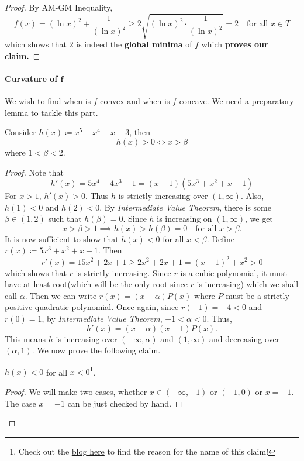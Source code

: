 \documentclass[numbers=endperiod, 11pt]{scrartcl}
\begin{document}
\begin{sol}
\begin{proof}
        By AM-GM Inequality,
        \[ f(x) = (\ln x)^2 + \frac{1}{(\ln x)^2} \ge 2\sqrt{(\ln x)^2 \cdot \frac{1}{(\ln x)^2}} = 2 \quad \text{for all } x \in T \]
        which shows that $2$ is indeed the
        \textbf{global minima} of $f$ which
        \textbf{proves our claim.}
    \end{proof}

    \paragraph{Curvature of $\bm{f}$} We wish to find
    when is $f$ convex and when is $f$ concave. We need a
    preparatory lemma to tackle this part.

    \begin{lemma*}
        Consider $h(x) \coloneqq x^5 - x^4 - x - 3$, then
        \[ h(x) > 0 \iff x > \beta\]
        where $1 < \beta < 2$.
    \end{lemma*}
    \begin{proof}
        Note that
        \[ h'(x) = 5x^4 - 4x^3 -1 = (x-1)(5x^3+x^2+x+1)\]
        For $x > 1$, $h'(x) > 0$. Thus $h$ is strictly
        increasing over $(1,\infty)$. Also,
        $h(1) < 0$ and $h(2) < 0$. By
        \emph{Intermediate Value Theorem}, there is
        some $\beta \in (1,2)$ such that $h(\beta) = 0$.
        Since $h$ is increasing on $(1,\infty)$, we get
        \[x > \beta > 1 \implies h(x) > h(\beta) = 0 \quad \text{for all }x > \beta. \]
        It is now sufficient to show that $h(x) < 0$
        for all $x < \beta$. Define
        $r(x) \coloneqq 5x^3 + x^2 + x + 1$. Then
        \[ r'(x) = 15x^2 + 2x + 1 \ge 2x^2 + 2x + 1 = (x+1)^2 + x^2 > 0\]
        which shows that $r$ is strictly increasing. Since
        $r$ is a cubic polynomial, it must have at least
        root(which will be the only root since $r$ is
        increasing) which we shall call $\alpha$. Then
        we can write $r(x) = (x-\alpha)P(x)$ where $P$
        must be a strictly positive quadratic polynomial.
        Once again, since $r(-1) = -4 < 0$ and $r(0) = 1$,
        by \emph{Intermediate Value Theorem},
        $-1 < \alpha < 0$. Thus,
        \[h'(x) = (x-\alpha)(x-1)P(x). \]
        This means $h$ is increasing over
        $(-\infty, \alpha)$ and $(1,\infty)$ and
        decreasing over $(\alpha, 1)$. We now prove the
        following claim.

        \begin{claim*}
            $h(x) < 0$ for all $x < 0$\footnote{Check out the \href{https://satisfiedmagma.github.io/writings/posts/isi_2026_discussion/}{blog here} to find the reason for the name of this claim!}.
        \end{claim*}
        \begin{proof}
            We will make two cases, whether
            $x \in (-\infty, -1)$ or $(-1,0)$ or $x = -1$.
            The case $x = -1$ can be just checked
            by hand.


\end{proof}
\end{proof}
\end{sol}
\end{document}
